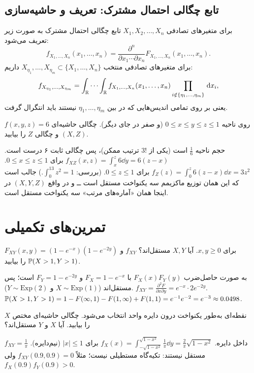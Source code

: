 \subsection{تابع چگالی احتمال مشترک: تعریف و حاشیه‌سازی}
برای متغیرهای تصادفی $X_1,X_2,\ldots,X_n$ تابع چگالی احتمال مشترک به صورت زیر تعریف می‌شود:
\[
f_{X_1,\ldots,X_n}(x_1,\ldots,x_n)=\frac{\partial^n}{\partial x_1\cdots\partial x_n}F_{X_1,\ldots,X_n}(x_1,\ldots,x_n).
\]
برای متغیرهای تصادفی منتخب $X_{\eta_1},\ldots,X_{\eta_m}\subset\{X_1,\ldots,X_n\}$ داریم:
\[
f_{X_{\eta_1},\ldots,X_{\eta_m}}=\int_{\mathbb{R}}\cdots\int_{\mathbb{R}} f_{X_1,\ldots,X_n}(x_1,\ldots,x_n)\prod_{i\notin\{\eta_1,\ldots,\eta_m\}}\,\mathrm{d} x_i ,
\]
یعنی بر روی تمامی اندیس‌هایی که در بین $\eta_1,\ldots,\eta_m$ نیستند باید انتگرال گرفت.

\begin{example}
$f(x,y,z)=6$ روی ناحیه $0\le x\le y\le z\le1$ (و صفر در جای دیگر). چگالی حاشیه‌ای $(X,Z)$ و چگالی $Z$ را بیابید.
\begin{solution}
حجم ناحیه $\frac16$ است (یکی از $3!$ ترتیب ممکن)، پس چگالی ثابت ۶ درست است.
$f_{XZ}(x,z)=\int_x^z6\dd y=6(z-x)$ برای $0\le x\le z\le1$.
$f_Z(z)=\int_0^z6(z-x)\dd x=3z^2$ برای $0\le z\le1$. (بررسی: $\int_0^13z^2=1$.) جالب است که این همان توزیع ماکزیمم سه یکنواخت مستقل است ــ و در واقع $(X,Y,Z)$ در اینجا همان «آماره‌های مرتب» سه یکنواخت مستقل است.
\end{solution}
\end{example}

\section{تمرین‌های تکمیلی}

\begin{exercise}
$F_{XY}(x,y)=(1-e^{-x})(1-e^{-2y})$ برای $x,y\ge0$. آیا $X,Y$ مستقل‌اند؟ $f_{XY}$ و $\mathbb{P}(X>1,Y>1)$ را بیابید.
\end{exercise}
\begin{solution}
 به صورت حاصل‌ضرب $F_X(x)F_Y(y)$ با $F_X=1-e^{-x}$ و $F_Y=1-e^{-2y}$ است؛ پس مستقل‌اند ($X\sim\mathrm{Exp}(1)$ و $Y\sim\mathrm{Exp}(2)$). $f_{XY}=\frac{\partial^2F}{\partial x\partial y}=e^{-x}\cdot2e^{-2y}$.
$\mathbb{P}(X>1,Y>1)=1-F(\infty,1)-F(1,\infty)+F(1,1)=e^{-1}e^{-2}=e^{-3}\approx0.0498$.
\end{solution}

\begin{exercise}
نقطه‌ای به‌طور یکنواخت درون دایره واحد انتخاب می‌شود. چگالی حاشیه‌ای مختص $X$ را بیابید. آیا $X$ و $Y$ مستقل‌اند؟
\end{exercise}
\begin{solution}
$f_{XY}=\frac1\pi$ داخل دایره. $f_X(x)=\int_{-\sqrt{1-x^2}}^{\sqrt{1-x^2}}\frac1\pi\dd y=\frac{2}{\pi}\sqrt{1-x^2}$ برای $|x|\le1$ (نیم‌دایره). مستقل نیستند: تکیه‌گاه مستطیلی نیست؛ مثلاً $f_{XY}(0.9,0.9)=0$ ولی $f_X(0.9)f_Y(0.9)>0$.
\end{solution}


